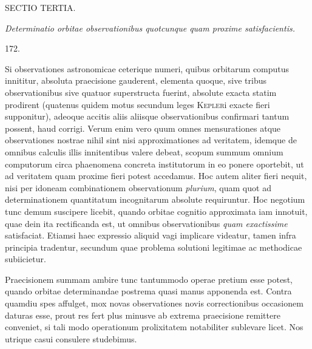 \clearpage
{}
\begin{center}
{\large SECTIO TERTIA.}\par\medskip
\emph{Determinatio orbitae observationibus quotcunque quam proxime satisfacientis.}\par\bigskip
\hypertarget{native-242-article172}{}172.
\end{center}
Si observationes astronomicae ceterique numeri, quibus orbitarum computus
innititur, absoluta praecisione gauderent, elementa quoque, sive tribus
observationibus sive quatuor superstructa fuerint, absolute exacta statim
prodirent (quatenus quidem motus secundum leges \textsc{Kepler}i exacte fieri
supponitur), adeoque accitis aliis aliisque observationibus confirmari tantum
possent, haud corrigi. Verum enim vero quum omnes mensurationes atque
observationes nostrae nihil sint nisi approximationes ad veritatem, idemque de
omnibus calculis illis innitentibus valere debeat, scopum summum omnium
computorum circa phaenomena concreta institutorum in eo ponere oportebit, ut
ad veritatem quam proxime fieri potest accedamus. Hoc autem aliter fieri
nequit, nisi per idoneam combinationem observationum \emph{plurium}, quam quot
ad determinationem quantitatum incognitarum absolute requiruntur. Hoc negotium
tunc demum suscipere licebit, quando orbitae cognitio approximata iam
innotuit, quae dein ita rectificanda est, ut omnibus observationibus
\emph{quam exactissime} satisfaciat. Etiamsi haec expressio aliquid vagi
implicare videatur, tamen infra principia tradentur, secundum quae problema
solutioni legitimae ac methodicae subiicietur.

Praecisionem summam ambire tunc tantummodo operae pretium esse potest, quando
orbitae determinandae postrema quasi manus apponenda est. Contra quamdiu spes
affulget, mox novas observationes novis correctionibus occasionem daturas esse, prout res fert plus minusve ab extrema praecisione
remittere conveniet, si tali modo operationum prolixitatem notabiliter
sublevare licet. Nos utrique casui consulere studebimus.
